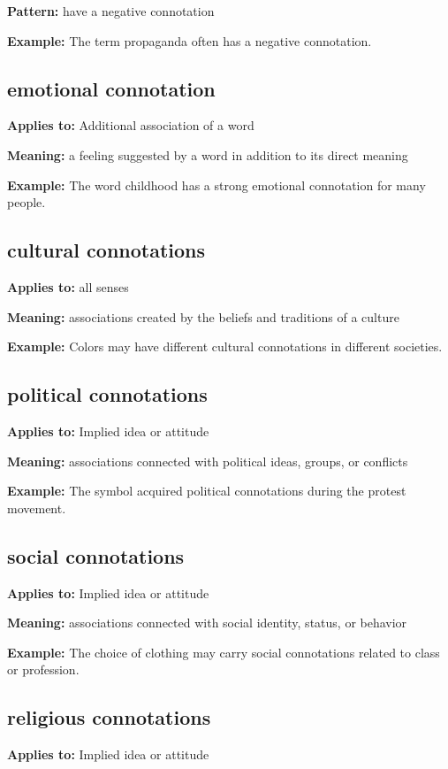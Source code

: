 \documentclass[11pt]{article}
\begin{document}
\textbf{Pattern:} have a negative connotation

\textbf{Example:} The term propaganda often has a negative connotation.

\subsection{emotional connotation}
\textbf{Applies to:} Additional association of a word

\textbf{Meaning:} a feeling suggested by a word in addition to its direct meaning

\textbf{Example:} The word childhood has a strong emotional connotation for many people.

\subsection{cultural connotations}
\textbf{Applies to:} all senses

\textbf{Meaning:} associations created by the beliefs and traditions of a culture

\textbf{Example:} Colors may have different cultural connotations in different societies.

\subsection{political connotations}
\textbf{Applies to:} Implied idea or attitude

\textbf{Meaning:} associations connected with political ideas, groups, or conflicts

\textbf{Example:} The symbol acquired political connotations during the protest movement.

\subsection{social connotations}
\textbf{Applies to:} Implied idea or attitude

\textbf{Meaning:} associations connected with social identity, status, or behavior

\textbf{Example:} The choice of clothing may carry social connotations related to class or profession.

\subsection{religious connotations}
\textbf{Applies to:} Implied idea or attitude
\end{document}
